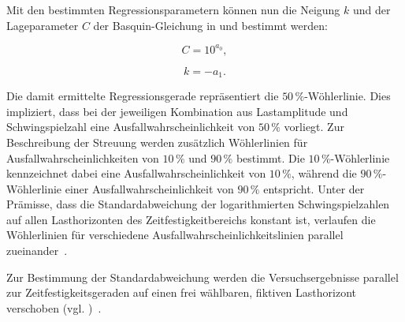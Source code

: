 Mit den bestimmten Regressionsparametern können nun die Neigung $k$ und der Lageparameter $C$ der Basquin-Gleichung in  und  bestimmt werden: 

\begin{equation}\label{eq:reg_C}
    C = 10^{a_0},
\end{equation}

\begin{equation}\label{eq:reg_k}
    k = -{a_1}.
\end{equation}

Die damit ermittelte Regressionsgerade repräsentiert die \(50\,\%\)-Wöhlerlinie. Dies impliziert, dass bei der jeweiligen
Kombination aus Lastamplitude und Schwingspielzahl eine Ausfallwahrscheinlichkeit von \(50\,\%\) vorliegt. Zur Beschreibung der Streuung werden zusätzlich Wöhlerlinien für Ausfallwahrscheinlichkeiten von $10\,\%$ und $90\,\%$ bestimmt. Die \(10\,\%\)-Wöhlerlinie kennzeichnet dabei eine Ausfallwahrscheinlichkeit von \(10\,\%\), während die \(90\,\%\)-Wöhlerlinie einer Ausfallwahrscheinlichkeit von
\(90\,\%\) entspricht.
Unter der Prämisse, dass die Standardabweichung der logarithmierten Schwingspielzahlen auf allen Lasthorizonten des Zeitfestigkeitbereichs konstant ist, verlaufen die Wöhlerlinien für verschiedene Ausfallwahrscheinlichkeitslinien parallel zueinander~\cite[Seite~63]{DIN50100}. 

\clearpage

Zur Bestimmung der Standardabweichung werden die Versuchsergebnisse parallel zur Zeitfestigkeitsgeraden auf einen frei wählbaren,
fiktiven Lasthorizont verschoben (vgl. )~\cite[Seite~56]{DIN50100}. 

